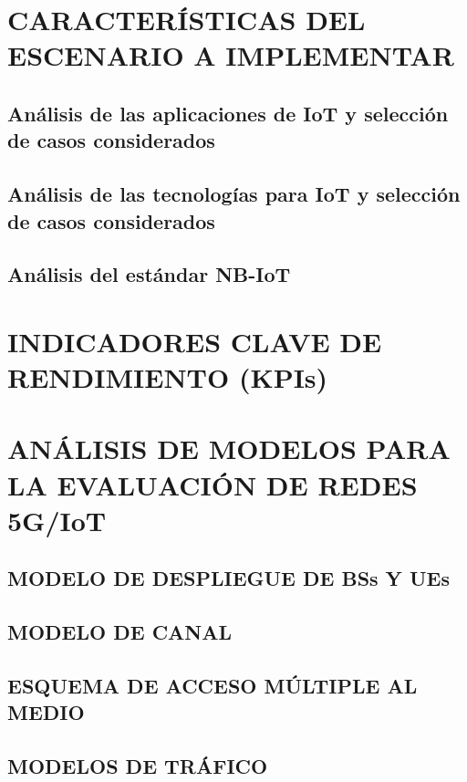 
\section{CARACTERÍSTICAS DEL ESCENARIO A IMPLEMENTAR}
\subsection{Análisis de las aplicaciones de IoT y selección de casos considerados}
\subsection{Análisis de las tecnologías para IoT y selección de casos considerados}
\subsection{Análisis del estándar NB-IoT}


\section{INDICADORES CLAVE DE RENDIMIENTO (KPIs)}


\section{ANÁLISIS DE MODELOS PARA LA EVALUACIÓN DE REDES 5G/IoT}
\subsection{MODELO DE DESPLIEGUE DE BSs Y UEs}
\subsection{MODELO DE CANAL}
\subsection{ESQUEMA DE ACCESO MÚLTIPLE AL MEDIO}
\subsection{MODELOS DE TRÁFICO}



